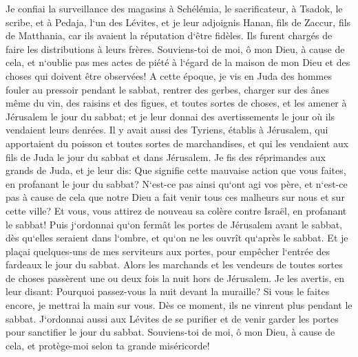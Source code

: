 \verse Je confiai la surveillance des magasins à Schélémia, le sacrificateur, à Tsadok, le scribe, et à Pedaja, l`un des Lévites, et je leur adjoignis Hanan, fils de Zaccur, fils de Matthania, car ils avaient la réputation d`être fidèles. Ils furent chargés de faire les distributions à leurs frères. 
\verse Souviens-toi de moi, ô mon Dieu, à cause de cela, et n`oublie pas mes actes de piété à l`égard de la maison de mon Dieu et des choses qui doivent être observées! 
\verse A cette époque, je vis en Juda des hommes fouler au pressoir pendant le sabbat, rentrer des gerbes, charger sur des ânes même du vin, des raisins et des figues, et toutes sortes de choses, et les amener à Jérusalem le jour du sabbat; et je leur donnai des avertissements le jour où ils vendaient leurs denrées. 
\verse Il y avait aussi des Tyriens, établis à Jérusalem, qui apportaient du poisson et toutes sortes de marchandises, et qui les vendaient aux fils de Juda le jour du sabbat et dans Jérusalem. 
\verse Je fis des réprimandes aux grands de Juda, et je leur dis: Que signifie cette mauvaise action que vous faites, en profanant le jour du sabbat? 
\verse N`est-ce pas ainsi qu`ont agi vos père, et n`est-ce pas à cause de cela que notre Dieu a fait venir tous ces malheurs sur nous et sur cette ville? Et vous, vous attirez de nouveau sa colère contre Israël, en profanant le sabbat! 
\verse Puis j`ordonnai qu`on fermât les portes de Jérusalem avant le sabbat, dès qu`elles seraient dans l`ombre, et qu`on ne les ouvrît qu`après le sabbat. Et je plaçai quelques-uns de mes serviteurs aux portes, pour empêcher l`entrée des fardeaux le jour du sabbat. 
\verse Alors les marchands et les vendeurs de toutes sortes de choses passèrent une ou deux fois la nuit hors de Jérusalem. 
\verse Je les avertis, en leur disant: Pourquoi passez-vous la nuit devant la muraille? Si vous le faites encore, je mettrai la main sur vous. Dès ce moment, ils ne vinrent plus pendant le sabbat. 
\verse J`ordonnai aussi aux Lévites de se purifier et de venir garder les portes pour sanctifier le jour du sabbat. Souviens-toi de moi, ô mon Dieu, à cause de cela, et protège-moi selon ta grande miséricorde! 
